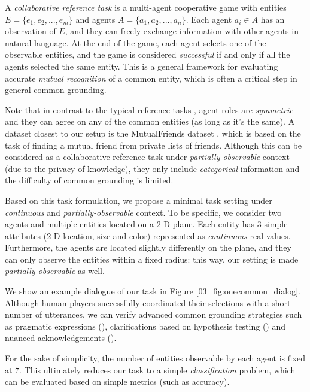 A \textit{collaborative reference task} is a multi-agent cooperative game with entities $E = \{e_1, e_2, ... , e_m\}$ and agents $A = \{a_1, a_2, ... , a_n\}$. Each agent $a_i \in A$ has an observation of $E$, and they can freely exchange information with other agents in natural language. At the end of the game, each agent selects one of the observable entities, and the game is considered \emph{successful} if and only if all the agents selected the same entity. This is a general framework for evaluating accurate \textit{mutual recognition} of a common entity, which is often a critical step in general common grounding.

Note that in contrast to the typical reference tasks \citep{kazemzadeh2014referit,de2017guesswhat}, agent roles are \textit{symmetric} and they can agree on any of the common entities (as long as it's the same). A dataset closest to our setup is the MutualFriends dataset \citep{he2017learning}, which is based on the task of finding a mutual friend from private lists of friends. Although this can be considered as a collaborative reference task under \emph{partially-observable} context (due to the privacy of knowledge), they only include \emph{categorical} information and the difficulty of common grounding is limited. 

Based on this task formulation, we propose a minimal task setting under \emph{continuous} and \emph{partially-observable} context. To be specific, we consider two agents and multiple entities located on a 2-D plane. Each entity has 3 simple attributes (2-D location, size and color) represented as \textit{continuous} real values. Furthermore, the agents are located slightly differently on the plane, and they can only observe the entities within a fixed radius: this way, our setting is made \textit{partially-observable} as well. 

We show an example dialogue of our task in Figure \ref{03_fig:onecommon_dialog}. Although human players successfully coordinated their selections with a short number of utterances, we can verify advanced common grounding strategies such as pragmatic expressions (), clarifications based on hypothesis testing () and nuanced acknowledgements ().

For the sake of simplicity, the number of entities observable by each agent is fixed at $7$. This ultimately reduces our task to a simple \textit{classification} problem, which can be evaluated based on simple metrics (such as accuracy).


